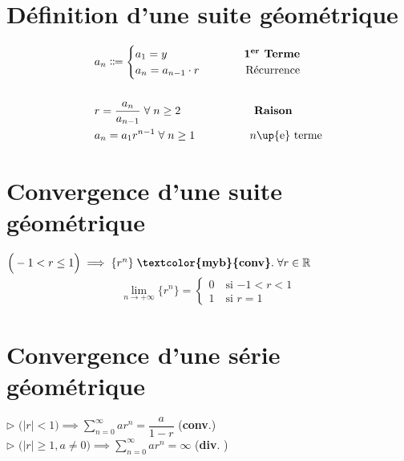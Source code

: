 \documentclass{report}
\begin{document}
\begin{multicols*}{3}
    \section{Définition d'une suite géométrique}
        \begin{align*}
                &a_n \Coloneqq 
                \begin{cases}
                    a_1 = y  &\omit\quad\quad\quad \textbf{1\textsuperscript{er} Terme} \\  a_{n} = a_{n-1} \cdot r &\omit\hfill \quad\quad Récurrence \end{cases} \\\\ &r = \frac{a_n}{a_{n-1}} \; \forall \; n \geq 2 \quad\quad\quad\quad\quad\quad\;\; \textbf{Raison} \\ &a_n = a_1r^{n - 1} \; \forall \; n \geq 1 \text{\quad\quad\quad\quad\;\; $n$\up{e} terme} \end{align*} 
        \section{Convergence d'une suite géométrique}
        \noindent       
        $\Big( -1 < r \leq 1 \Big) \implies \{r^n\} \; \textbf{\textcolor{myb}{conv}}. \; 
        \forall r \in \mathbb{R}$
        \begin{align*}
            \lim\limits_{n\to+\infty }\{r^n\} = 
                    \begin{cases}
                        0 \quad \text{si $-1 < r < 1$} \\
                        1 \quad \text{si $r = 1$}
                    \end{cases}
        \end{align*}


    \section{Convergence d'une série géométrique}
        \noindent$\rhd$ 
            $\Big(|r| < 1\big) \implies  
            \sum_{n=0}^{\infty }ar^{n} = 
            \dfrac{a}{1 - r} $ \;\;(\textbf{\textcolor{myb}{conv}}.)  
        \\
        $\rhd$ 
            $\bigl(|r| \geq 1, a \neq 0\bigr) \implies 
            \sum_{n=0}^{\infty }ar^{n} = \infty$ 
            (\textbf{\textcolor{myr}{div}}. )   



\end{multicols*}
\end{document}
